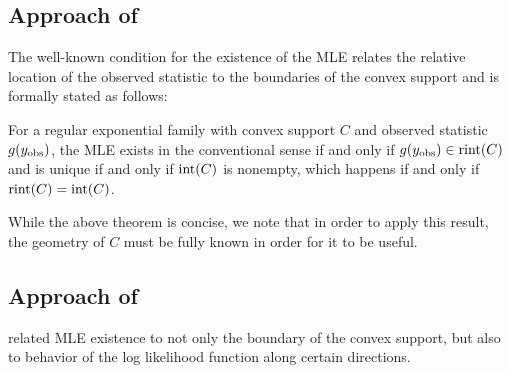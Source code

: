\subsection{Approach of \citet{Barndorff}}
The well-known condition for the existence of the MLE 
relates the relative location of the observed statistic to the boundaries of 
the convex support and is formally stated as follows:
\begin{theorem} \label{Thm:MLE rint}
For a regular exponential family with convex support $C$ and observed statistic $g(y_{\text{obs}})$, the MLE exists in the conventional sense if and only if 
$g(y_{\text{obs}}) \in \operatorname{rint}(C)$ and is unique if and only if $\operatorname{int}(C)$ is nonempty, which
happens if and only if $\operatorname{rint}(C) = \operatorname{int}(C)$. 
\end{theorem}

While the above theorem is concise, we note that in order to apply this result, 
the geometry of $C$ must be fully known in order for it to be useful.

\subsection{Approach of \citet{Geyer:gdor}}
\citet{Geyer:1990,Geyer:gdor} related MLE existence to
 not only the boundary of the convex support, but also to behavior of the log likelihood function along certain directions.

